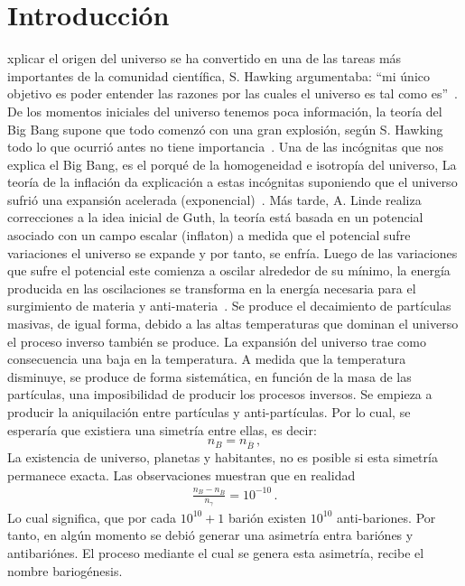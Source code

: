 \chapter{Introducción} 
%
xplicar el origen del universo se ha convertido en una de las tareas más importantes de la comunidad científica, S. Hawking argumentaba: ``mi único objetivo es poder entender las razones por las cuales el universo es tal como es''~\cite{boslough1989stephen}. De los momentos iniciales del universo tenemos poca información, la teoría del Big Bang supone que todo comenzó con una gran explosión, según S. Hawking todo lo que ocurrió antes no tiene importancia~\cite{tyson_hawking_2018}. Una de las incógnitas que nos explica el Big Bang, es el porqué de la homogeneidad e isotropía del universo, La teoría de la inflación da explicación a estas incógnitas suponiendo que el universo sufrió una  expansión acelerada (exponencial)~\cite{Guth:1981}. Más tarde, A. Linde realiza correcciones a la idea inicial de Guth, la teoría está basada en un potencial asociado con un campo escalar (inflaton) a medida que el potencial sufre variaciones el universo se expande y por tanto, se enfría. Luego de las variaciones que sufre el potencial este comienza a oscilar alrededor de su mínimo, la energía producida en las oscilaciones se transforma en la energía necesaria para el surgimiento de materia y anti-materia~\cite{Linde:1981mu}. Se produce el decaimiento de partículas masivas, de igual forma, debido a las altas temperaturas que dominan el universo el proceso inverso también se produce. La expansión del universo trae como consecuencia una baja en la temperatura. A medida que la temperatura disminuye, se produce de forma sistemática, en función de la masa de las partículas, una imposibilidad de producir los procesos inversos. Se empieza a producir la aniquilación entre partículas y anti-partículas. Por lo cual, se esperaría que existiera una simetría entre ellas, es decir:%
% 
% 
\begin{equation}
n_{B}=	n_{\overline{B}}\, ,
\end{equation}
%
La existencia de universo, planetas y habitantes, no es posible si esta simetría permanece exacta. Las observaciones muestran que en realidad~\cite{PDBook}
%
\begin{align}
\frac{n_{B}-n_{\overline{B}}}{n_{\gamma}}=10^{-10}\, .
\end{align}
%
Lo cual significa, que por cada $10^{10}+1$ barión existen $10^{10}$ anti-bariones. Por tanto, en algún momento se debió generar una asimetría entra bariónes y antibariónes. El proceso mediante el cual se genera esta asimetría, recibe el nombre bariogénesis.
